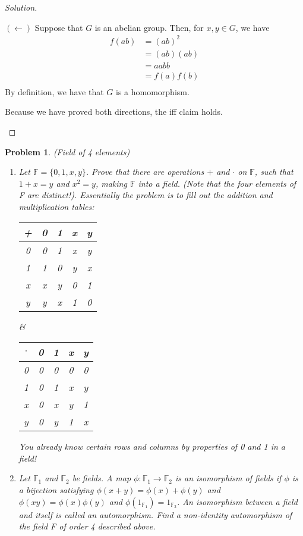 \documentclass[11 pt]{article}
\newtheorem{Prob}{Problem}
\theoremstyle{definition}
\theoremstyle{remark}
\newenvironment{solution}
  {\renewcommand\qedsymbol{$\blacksquare$}\begin{proof}[Solution]}
  {\end{proof}}
\begin{document}
\begin{solution}
\begin{enumerate}
    $(\leftarrow)$ Suppose that $G$ is an abelian group. Then, for $x,y \in G$, we have
    \begin{align}
        f(ab) &= (ab)^2 \\
          &= (ab)(ab) \\
          &= aabb \\
          &= f(a)f(b) \\
    \end{align}
    By definition, we have that $G$ is a homomorphism.
    
    Because we have proved both directions, the iff claim holds.
\end{enumerate}

\end{solution}

\begin{Prob} (Field of 4 elements)
	\begin{enumerate}
		\item  Let $\mathbb{F} = \{0, 1, x, y\}$. Prove that there are operations $+$ and $\cdot$ on $\mathbb{F}$, such that $1 + x = y$ and $x^2 = y$, making $\mathbb{F}$ into a field. (Note that the four elements of F are distinct!). Essentially the problem is to fill out the addition and multiplication tables:
		
		\begin{center}
			\begin{tabular}{ c| c | c | c | c |}
				+ & 0 & 1 & x & y \\
				\hline
				0 & 0 & 1 & x & y \\ 
				\hline
				1 & 1 & 0 & y & x \\ 
				\hline
				x & x & y & 0 & 1 \\ 
				\hline
				y & y & x & 1 & 0 \\ 
				\hline
			\end{tabular}  &
			\begin{tabular}{ c| c | c | c | c |}
				$\cdot$ & 0 & 1 & x & y \\
				\hline
				0 & 0 & 0 & 0 & 0 \\ 
				\hline
				1 & 0 & 1 & x & y \\ 
				\hline
				x & 0 & x & y & 1 \\ 
				\hline
				y & 0 & y & 1 & x \\ 
				\hline
			\end{tabular}
		\end{center}
		
	
		You already know certain rows and columns by properties of 0 and 1 in a field!
		\item Let $\mathbb{F}_1$ and $\mathbb{F}_2$ be fields. A map $\phi : \mathbb{F}_1 \rightarrow \mathbb{F}_2$ is an isomorphism of fields if $\phi$ is a bijection satisfying $\phi(x + y) = \phi(x) + \phi(y)$ and $\phi(xy) = \phi(x)\phi(y)$ and $\phi(1_{\mathbb{F}_1}) = 1_{\mathbb{F}_2}$. An isomorphism between a field and itself is called an automorphism. Find a non-identity automorphism of the field F of order 4 described above.
		

\end{enumerate}
\end{Prob}
\end{document}
